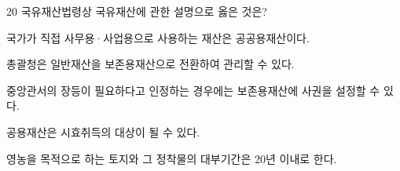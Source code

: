 \begin{question}{20}
국유재산법령상 국유재산에 관한 설명으로 옳은 것은?
\begin{choices}
  \item 국가가 직접 사무용·사업용으로 사용하는 재산은 공공용재산이다.
  \item 총괄청은 일반재산을 보존용재산으로 전환하여 관리할 수 있다.
  \item 중앙관서의 장등이 필요하다고 인정하는 경우에는 보존용재산에 사권을 설정할 수 있다.
  \item 공용재산은 시효취득의 대상이 될 수 있다.
  \item 영농을 목적으로 하는 토지와 그 정착물의 대부기간은 20년 이내로 한다.
\end{choices}
\end{question}
